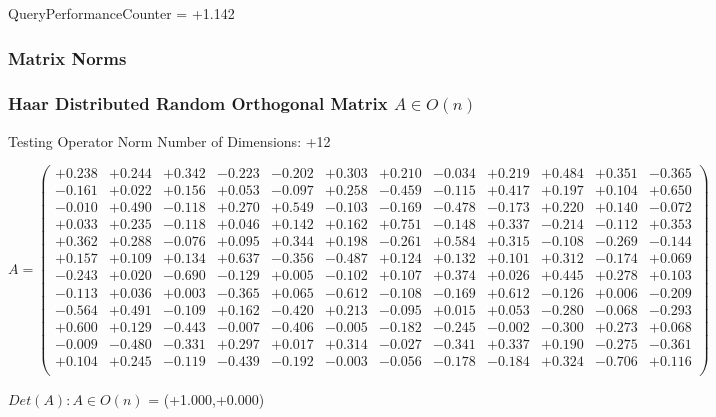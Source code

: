 \documentclass[9pt]{article}
\theoremstyle{plain}
\theoremstyle{definition}
\theoremstyle{remark}
\numberwithin{equation}{section}
\begin{document}
QueryPerformanceCounter  =  +1.142
\subsubsection{Matrix Norms}
\subsubsection{Haar Distributed Random Orthogonal Matrix $A \in O(n)$}
 Testing Operator Norm
Number of Dimensions: +12

$A = \left(
\begin{array}{
cccccccccccc}
+0.238 & +0.244 & +0.342 & -0.223 & -0.202 & +0.303 & +0.210 & -0.034 & +0.219 & +0.484 & +0.351 & -0.365 \\
-0.161 & +0.022 & +0.156 & +0.053 & -0.097 & +0.258 & -0.459 & -0.115 & +0.417 & +0.197 & +0.104 & +0.650 \\
-0.010 & +0.490 & -0.118 & +0.270 & +0.549 & -0.103 & -0.169 & -0.478 & -0.173 & +0.220 & +0.140 & -0.072 \\
+0.033 & +0.235 & -0.118 & +0.046 & +0.142 & +0.162 & +0.751 & -0.148 & +0.337 & -0.214 & -0.112 & +0.353 \\
+0.362 & +0.288 & -0.076 & +0.095 & +0.344 & +0.198 & -0.261 & +0.584 & +0.315 & -0.108 & -0.269 & -0.144 \\
+0.157 & +0.109 & +0.134 & +0.637 & -0.356 & -0.487 & +0.124 & +0.132 & +0.101 & +0.312 & -0.174 & +0.069 \\
-0.243 & +0.020 & -0.690 & -0.129 & +0.005 & -0.102 & +0.107 & +0.374 & +0.026 & +0.445 & +0.278 & +0.103 \\
-0.113 & +0.036 & +0.003 & -0.365 & +0.065 & -0.612 & -0.108 & -0.169 & +0.612 & -0.126 & +0.006 & -0.209 \\
-0.564 & +0.491 & -0.109 & +0.162 & -0.420 & +0.213 & -0.095 & +0.015 & +0.053 & -0.280 & -0.068 & -0.293 \\
+0.600 & +0.129 & -0.443 & -0.007 & -0.406 & -0.005 & -0.182 & -0.245 & -0.002 & -0.300 & +0.273 & +0.068 \\
-0.009 & -0.480 & -0.331 & +0.297 & +0.017 & +0.314 & -0.027 & -0.341 & +0.337 & +0.190 & -0.275 & -0.361 \\
+0.104 & +0.245 & -0.119 & -0.439 & -0.192 & -0.003 & -0.056 & -0.178 & -0.184 & +0.324 & -0.706 & +0.116 \\
\end{array}
\right)$ \newline 

$Det(A) :   A \in O(n)$ = (+1.000,+0.000)
\end{document}
